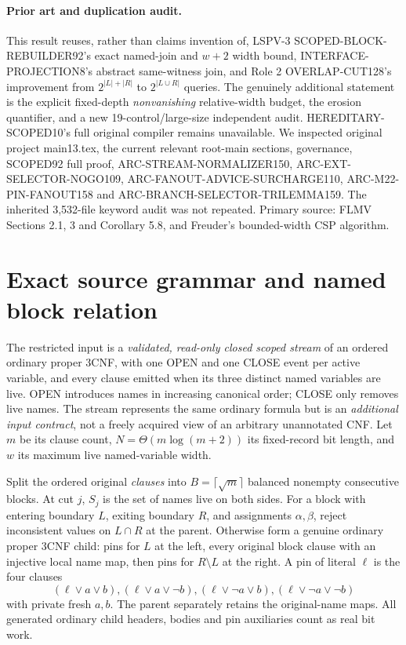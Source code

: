 \documentclass[11pt]{article}
\begin{document}
\paragraph{Prior art and duplication audit.}
This result reuses, rather than claims invention of, LSPV-3 SCOPED-BLOCK-REBUILDER92's exact named-join and $w+2$ width bound, INTERFACE-PROJECTION8's abstract same-witness join, and Role 2 OVERLAP-CUT128's improvement from $2^{|L|+|R|}$ to $2^{|L\cup R|}$ queries. The genuinely additional statement is the explicit fixed-depth \emph{nonvanishing} relative-width budget, the erosion quantifier, and a new 19-control/large-size independent audit. HEREDITARY-SCOPED10's full original compiler remains unavailable. We inspected original project main13.tex, the current relevant root-main sections, governance, SCOPED92 full proof, ARC-STREAM-NORMALIZER150, ARC-EXT-SELECTOR-NOGO109, ARC-FANOUT-ADVICE-SURCHARGE110, ARC-M22-PIN-FANOUT158 and ARC-BRANCH-SELECTOR-TRILEMMA159. The inherited 3,532-file keyword audit was not repeated. Primary source: FLMV Sections 2.1, 3 and Corollary 5.8, and Freuder's bounded-width CSP algorithm.

\section{Exact source grammar and named block relation}
The restricted input is a \emph{validated, read-only closed scoped stream} of an ordered ordinary proper 3CNF, with one OPEN and one CLOSE event per active variable, and every clause emitted when its three distinct named variables are live. OPEN introduces names in increasing canonical order; CLOSE only removes live names. The stream represents the same ordinary formula but is an \emph{additional input contract}, not a freely acquired view of an arbitrary unannotated CNF. Let $m$ be its clause count, $N=\Theta(m\log(m+2))$ its fixed-record bit length, and $w$ its maximum live named-variable width.

Split the ordered original \emph{clauses} into $B=\lceil\sqrt m\rceil$ balanced nonempty consecutive blocks. At cut $j$, $S_j$ is the set of names live on both sides. For a block with entering boundary $L$, exiting boundary $R$, and assignments $\alpha,\beta$, reject inconsistent values on $L\cap R$ at the parent. Otherwise form a genuine ordinary proper 3CNF child: pins for $L$ at the left, every original block clause with an injective local name map, then pins for $R\setminus L$ at the right. A pin of literal $\ell$ is the four clauses
\[
(\ell\vee a\vee b),(\ell\vee a\vee\neg b),
(\ell\vee\neg a\vee b),(\ell\vee\neg a\vee\neg b)
\]
with private fresh $a,b$. The parent separately retains the original-name maps. All generated ordinary child headers, bodies and pin auxiliaries count as real bit work.
\end{document}
